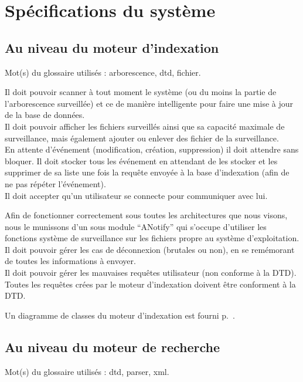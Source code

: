 \documentclass[a4paper,12pt]{report}
\begin{document}
\chapter{Spécifications du système}

\section{Au niveau du moteur d'indexation}
Mot(s) du glossaire utilisés : \gls{arborescence}, \gls{dtd}, \gls{fichier}.

Il doit pouvoir scanner à tout moment le système (ou du moins la partie de l'arborescence surveillée) et ce de manière intelligente pour faire une mise à jour de la base de données.\\
Il doit pouvoir afficher les fichiers surveillés ainsi que sa capacité maximale de surveillance, mais également ajouter ou enlever des fichier de la surveillance.\\
En attente d'événement (modification, création, suppression) il doit attendre sans bloquer. Il doit stocker tous les événement en attendant de les stocker et les supprimer de sa liste une fois la requête envoyée à la base d'indexation (afin de ne pas répéter l'événement).\\
Il doit accepter qu'un utilisateur se connecte pour communiquer avec lui.

Afin de fonctionner correctement sous toutes les architectures que nous visons, nous le munissons d'un sous module \enquote{ANotify} qui s'occupe d'utiliser les fonctions système de surveillance sur les fichiers propre au système d'exploitation.\\
Il doit pouvoir gérer les cas de déconnexion (brutales ou non), en se remémorant de toutes les informations à envoyer.\\
Il doit pouvoir gérer les mauvaises requêtes utilisateur (non conforme à la DTD). Toutes les requêtes crées par le moteur d'indexation doivent être conforment à la DTD.

Un diagramme de classes du moteur d'indexation est fourni p.~\pageref{diagramme_classes_mi}.

\section{Au niveau du moteur de recherche}
Mot(s) du glossaire utilisés : \gls{dtd}, \gls{parser}, \gls{xml}.
\end{document}
